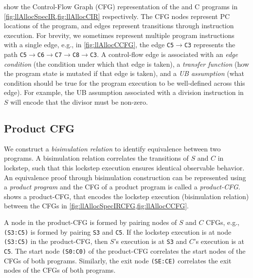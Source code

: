  show the Control-Flow Graph (CFG) representation
of the \SpecL{} and C programs in \cref{fig:llAllocSpecIR,fig:llAllocCIR} respectively.
The CFG nodes represent PC locations of the program, and edges represent
transitions through instruction execution. For brevity, we sometimes represent
multiple program instructions with a single edge, e.g., in \cref{fig:llAllocCCFG}, the edge {\small \tt C5$\rightarrow$C3}
represents the path {\small \tt C5$\rightarrow$C6$\rightarrow$C7$\rightarrow$C8$\rightarrow$C3}. A control-flow edge is associated
with an {\em edge condition} (the condition under which that edge is taken),
a {\em transfer function} (how the program state is mutated if that edge is taken),
and a {\em UB assumption} (what condition should be true for the program
execution to be
well-defined across this edge). For example, the UB assumption associated with a division
instruction in $S$ will encode that the divisor must be non-zero.



\subsection{Product CFG}
\label{sec:productCFG}
We construct
a {\em bisimulation relation} to identify
equivalence between two programs. 
A bisimulation relation correlates
the transitions of $S$ and $C$ in lockstep, such that this
lockstep execution ensures
identical observable behavior.
An equivalence proof through bisimulation construction
can be represented using a
{\em product program} \cite{covac} and the CFG of a product program is called a {\em product-CFG}.
 shows a product-CFG,
that encodes the lockstep execution (bisimulation relation) between the
CFGs in \cref{fig:llAllocSpecIRCFG,fig:llAllocCCFG}.

A node in the product-CFG is formed by pairing nodes
of $S$ and $C$ CFGs, e.g., {\tt (S3:C5)} is formed by
pairing {\tt S3} and {\tt C5}.
If the lockstep
execution is at node {\tt (S3:C5)} in the product-CFG,
then $S$'s execution is at {\tt S3} and $C$'s execution
is at {\tt C5}.
The start node {\tt (S0:C0)} of the product-CFG
correlates the start nodes of the CFGs of both programs.
Similarly, the exit node {\tt (SE:CE)}
correlates the exit nodes of the CFGs of both programs.

